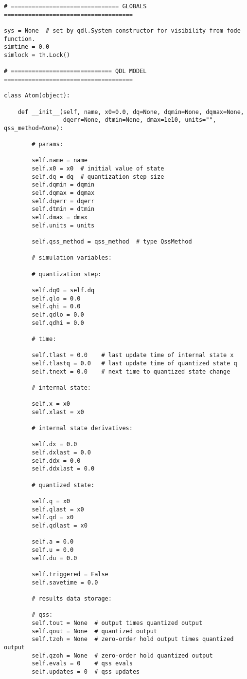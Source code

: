 \begin{lstlisting}
# =============================== GLOBALS =====================================

sys = None  # set by qdl.System constructor for visibility from fode function.
simtime = 0.0
simlock = th.Lock()

# ============================= QDL MODEL =====================================

class Atom(object):

    def __init__(self, name, x0=0.0, dq=None, dqmin=None, dqmax=None,
                 dqerr=None, dtmin=None, dmax=1e10, units="", qss_method=None):

        # params:

        self.name = name
        self.x0 = x0  # initial value of state
        self.dq = dq  # quantization step size
        self.dqmin = dqmin
        self.dqmax = dqmax
        self.dqerr = dqerr
        self.dtmin = dtmin
        self.dmax = dmax
        self.units = units

        self.qss_method = qss_method  # type QssMethod

        # simulation variables:

        # quantization step:

        self.dq0 = self.dq
        self.qlo = 0.0
        self.qhi = 0.0
        self.qdlo = 0.0
        self.qdhi = 0.0

        # time:

        self.tlast = 0.0    # last update time of internal state x
        self.tlastq = 0.0   # last update time of quantized state q
        self.tnext = 0.0    # next time to quantized state change

        # internal state:

        self.x = x0
        self.xlast = x0

        # internal state derivatives:

        self.dx = 0.0
        self.dxlast = 0.0
        self.ddx = 0.0
        self.ddxlast = 0.0

        # quantized state:

        self.q = x0
        self.qlast = x0
        self.qd = x0
        self.qdlast = x0

        self.a = 0.0
        self.u = 0.0
        self.du = 0.0

        self.triggered = False
        self.savetime = 0.0

        # results data storage:

        # qss:
        self.tout = None  # output times quantized output
        self.qout = None  # quantized output
        self.tzoh = None  # zero-order hold output times quantized output
        self.qzoh = None  # zero-order hold quantized output
        self.evals = 0    # qss evals
        self.updates = 0  # qss updates


\end{lstlisting}
